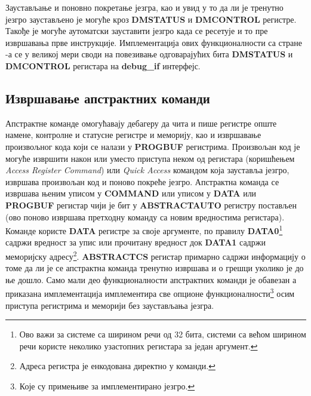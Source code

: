 Заустављање и поновно покретање језгра, као и увид у то да ли је тренутно језгро заустављено је могуће кроз \textbf{\acrshort{DMSTATUS}} и \textbf{\acrshort{DMCONTROL}} регистре. Такође је могуће аутоматски зауставити језгро када се ресетује и то пре извршавања прве инструкције. Имплементација ових функционалности са стране -а се у великој мери своди на повезивање одговарајућих бита \textbf{\acrshort{DMSTATUS}} и \textbf{\acrshort{DMCONTROL}} регистара на \textbf{debug\_if} интерфејс.

\subsection{Извршавање апстрактних команди}

Апстрактне команде омогућавају дебагеру да чита и пише регистре опште намене, контролне и статусне регистре и меморију, као и извршавање произвољног кода који се налази у \textbf{\acrshort{PROGBUF}} регистрима. Произвољан код је могуће извршити након или уместо приступа неком од регистара (коришћењем \textit{Access Register Command}) или \textit{Quick Access} командом која зауставља језгро, извршава произвољан код и поново покреће језгро. Апстрактна команда се извршава њеним уписом у \textbf{COMMAND} или уписом у \textbf{DATA} или \textbf{\acrshort{PROGBUF}} регистар чији је бит у \textbf{ABSTRACTAUTO} регистру постављен (ово поново извршава претходну команду са новим вредностима регистара). Команде користе \textbf{DATA} регистре за своје аргументе, по правилу  \textbf{DATA0}\footnote{Ово важи за системе са ширином речи од 32 бита, системи са већом ширином речи користе неколико узастопних регистара за један аргумент.} садржи вредност за упис или прочитану вредност док \textbf{DATA1} садржи меморијску адресу\footnote{Адреса регистра је енкодована директно у команди.}. \textbf{\acrshort{ABSTRACTCS}} регистар примарно садржи информацију о томе да ли је се апстрактна команда тренутно извршава и о грешци уколико је до ње дошло. Само мали део функционалности апстрактних команди је обавезан а приказана имплементација имплементира све опционе функционалности\footnote{Које су примењиве за имплементирано језгро.} осим приступа регистрима и меморији без заустављања језгра.

